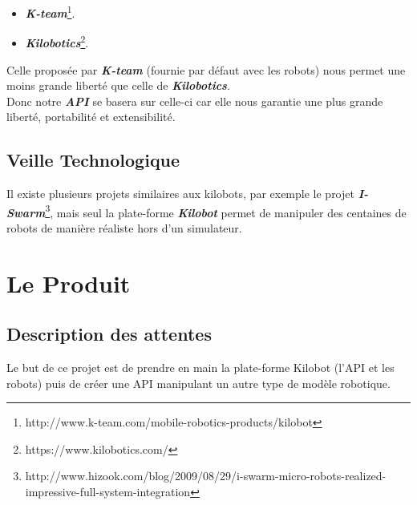 \documentclass[a4paper,8pt]{report}
\begin{document}
\begin{itemize}
\item \textit{\textbf{K-team}}\footnote{http://www.k-team.com/mobile-robotics-products/kilobot}.
\item \textit{\textbf{Kilobotics}}\footnote{https://www.kilobotics.com/}.
\end{itemize}

\medskip
Celle propos\'ee par \textit{\textbf{K-team}} (fournie par d\'efaut avec les robots) nous permet une moins grande libert\'e que celle de \textit{\textbf{Kilobotics}}.\\
Donc notre \textit{\textbf{API}} se basera sur celle-ci car elle nous garantie une plus grande libert\'e, portabilit\'e et extensibilit\'e.

\section*{Veille Technologique}\label{sec:name}

Il existe plusieurs projets similaires aux kilobots, par exemple le projet \textit{\textbf{I-Swarm}}\footnote{http://www.hizook.com/blog/2009/08/29/i-swarm-micro-robots-realized-impressive-full-system-integration}, mais seul la plate-forme \textit{\textbf{Kilobot}} permet de manipuler des centaines de robots de mani\`ere r\'ealiste hors d'un simulateur.\\

\chapter{Le Produit}

\section*{Description des attentes}\label{sec:name}

Le but de ce projet est de prendre en main la plate-forme Kilobot (l'API et les robots) puis de cr\'eer une API manipulant un autre type de mod\`ele robotique.\\
\end{document}
